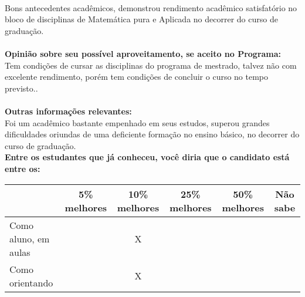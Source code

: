 \documentclass[11pt]{article}
\begin{document}
\\Bons antecedentes acadêmicos, demonstrou rendimento acadêmico satisfatório no bloco de disciplinas de Matemática pura e Aplicada no decorrer do curso de graduação. \\
\\
\textbf{Opinião sobre seu possível aproveitamento, se aceito no Programa:}
\\Tem condições de cursar as disciplinas do programa de mestrado, talvez não com excelente rendimento, porém tem condições de concluir o curso no tempo previsto..\\ 
\\
\textbf{Outras informações relevantes:} \\Foi um acadêmico bastante empenhado em seus estudos, superou grandes dificuldades oriundas de uma deficiente formação no ensino básico, no decorrer do curso de graduação.
\\[0.3cm]
\textbf{Entre os estudantes que já conheceu, você diria que o candidato está entre os:}
\\
\begin{tabular}{|l|c|c|c|c|c|}
\hline
 & 5\% melhores & 10\% melhores & 25\% melhores & 50\% melhores & Não sabe \\
\hline
Como aluno, em aulas &  & X &  &  & \\
\hline
Como orientando &  & X &  &  & \\
\hline
\end{tabular}
\end{document}
